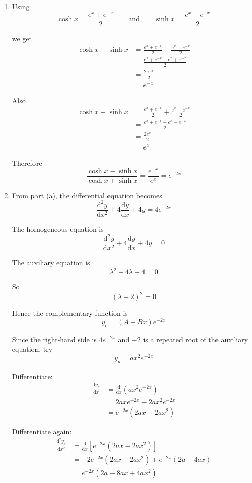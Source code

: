 \documentclass[leqno]{article}
\begin{document}
\begin{enumerate}[
  label=\textbf{\arabic*.},
  leftmargin=*,
  topsep=0pt,
  partopsep=0pt,
  parsep=0pt
]
\vspace*{10pt}

\begin{djsSolution}
\begin{enumerate}[label=\textbf{(\alph*)}]
  \item Using
\[
\cosh x=\frac{e^x+e^{-x}}{2}
\qquad \text{and} \qquad
\sinh x=\frac{e^x-e^{-x}}{2}
\]

we get
\begin{align*}
\cosh x-\sinh x
&= \frac{e^x+e^{-x}}{2}-\frac{e^x-e^{-x}}{2} \\
&= \frac{e^x+e^{-x}-e^x+e^{-x}}{2} \\
&= \frac{2e^{-x}}{2} \\
&= e^{-x}
\end{align*}

Also
\begin{align*}
\cosh x+\sinh x
&= \frac{e^x+e^{-x}}{2}+\frac{e^x-e^{-x}}{2} \\
&= \frac{e^x+e^{-x}+e^x-e^{-x}}{2} \\
&= \frac{2e^x}{2} \\
&= e^x
\end{align*}

Therefore
\[
\frac{\cosh x-\sinh x}{\cosh x+\sinh x}
= \frac{e^{-x}}{e^x}
= e^{-2x}
\]

\item From part (a), the differential equation becomes
\[
\frac{\mathrm{d}^2 y}{\mathrm{d}x^2}+4\frac{\mathrm{d}y}{\mathrm{d}x}+4y=4e^{-2x}
\]

The homogeneous equation is
\[
\frac{\mathrm{d}^2 y}{\mathrm{d}x^2}+4\frac{\mathrm{d}y}{\mathrm{d}x}+4y=0
\]

The auxiliary equation is
\[
\lambda^2+4\lambda+4=0
\]

So
\[
(\lambda+2)^2=0
\]

Hence the complementary function is
\[
y_c=(A+Bx)e^{-2x}
\]

Since the right-hand side is $4e^{-2x}$ and $-2$ is a repeated root of the auxiliary equation, try
\[
y_p=ax^2e^{-2x}
\]

Differentiate:
\begin{align*}
\frac{\mathrm{d}y_p}{\mathrm{d}x}
&= \frac{\mathrm{d}}{\mathrm{d}x}\left(ax^2e^{-2x}\right) \\
&= 2axe^{-2x}-2ax^2e^{-2x} \\
&= e^{-2x}(2ax-2ax^2)
\end{align*}

Differentiate again:
\begin{align*}
\frac{\mathrm{d}^2y_p}{\mathrm{d}x^2}
&= \frac{\mathrm{d}}{\mathrm{d}x}\left[e^{-2x}(2ax-2ax^2)\right] \\
&= -2e^{-2x}(2ax-2ax^2)+e^{-2x}(2a-4ax) \\
&= e^{-2x}(2a-8ax+4ax^2)
\end{align*}


\end{enumerate}
\end{djsSolution}
\end{enumerate}
\end{document}

